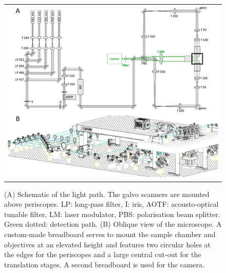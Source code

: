 \documentclass[12pt]{spieman}  %
\begin{document}
\begin{spacing}{2}
		\begin{figure}
   \begin{center}
   \begin{tabular}{c}
   \includegraphics[width=\textwidth]{panel1.eps}
   \end{tabular}
   \end{center}
   \caption{\label{fig:excitation} (A) Schematic of the light path. The galvo scanners are mounted above periscopes. LP: long-pass filter, I: iris, AOTF: acousto-optical tunable filter, LM: laser modulator, PBS: polarisation beam splitter. Green dotted: detection path. (B) Oblique view of the microscope. A custom-made breadboard serves to mount the sample chamber and objectives at an elevated height and features two circular holes at the edges for the periscopes and a large central cut-out for the translation stages. A second breadboard is used for the camera.} 
   \end{figure}


\end{spacing}
\end{document}
